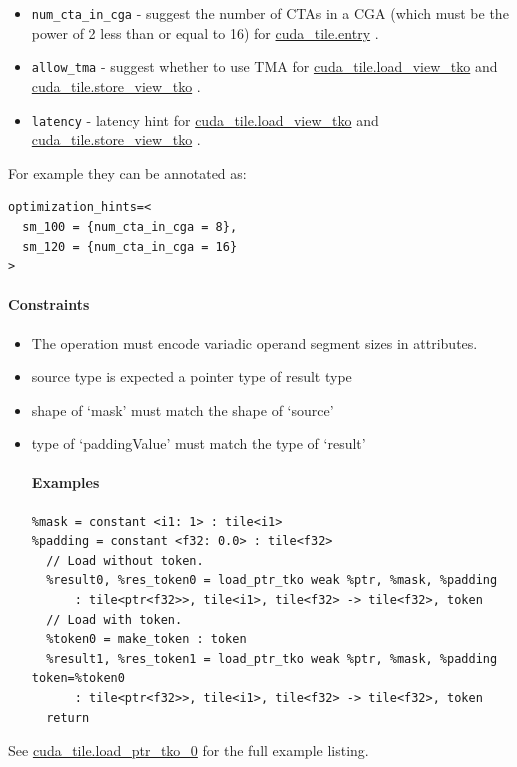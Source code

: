\documentclass{article}
\begin{document}
\begin{itemize}
\item \texttt{num\_cta\_in\_cga} - suggest the number of CTAs in a CGA (which must be the power of 2 less than or equal to 16) for \href{https://docs.nvidia.com/cuda/tile-ir/latest/sections/operations.html#op-cuda-tile-entry}{cuda\_tile.entry} .
\item \texttt{allow\_tma} - suggest whether to use TMA for \href{https://docs.nvidia.com/cuda/tile-ir/latest/sections/operations.html#op-cuda-tile-load-view-tko}{cuda\_tile.load\_view\_tko} and \href{https://docs.nvidia.com/cuda/tile-ir/latest/sections/operations.html#op-cuda-tile-store-view-tko}{cuda\_tile.store\_view\_tko} .
\item \texttt{latency} - latency hint for \href{https://docs.nvidia.com/cuda/tile-ir/latest/sections/operations.html#op-cuda-tile-load-view-tko}{cuda\_tile.load\_view\_tko} and \href{https://docs.nvidia.com/cuda/tile-ir/latest/sections/operations.html#op-cuda-tile-store-view-tko}{cuda\_tile.store\_view\_tko} .

\end{itemize}
For example they can be annotated as:


\begin{lstlisting}
optimization_hints=<
  sm_100 = {num_cta_in_cga = 8},
  sm_120 = {num_cta_in_cga = 16}
>
\end{lstlisting}


\paragraph{Constraints}

\begin{itemize}
\item The operation must encode variadic operand segment sizes in attributes.
\item source type is expected a pointer type of result type
\item shape of `mask' must match the shape of `source'
\item type of `paddingValue' must match the type of `result'


\paragraph{Examples}

\begin{lstlisting}
%mask = constant <i1: 1> : tile<i1>
%padding = constant <f32: 0.0> : tile<f32>
  // Load without token.
  %result0, %res_token0 = load_ptr_tko weak %ptr, %mask, %padding
      : tile<ptr<f32>>, tile<i1>, tile<f32> -> tile<f32>, token
  // Load with token.
  %token0 = make_token : token
  %result1, %res_token1 = load_ptr_tko weak %ptr, %mask, %padding token=%token0
      : tile<ptr<f32>>, tile<i1>, tile<f32> -> tile<f32>, token
  return
\end{lstlisting}

\end{itemize}
See \href{https://docs.nvidia.com/cuda/tile-ir/latest/sections/appendix.html#example-cuda-tile-load-ptr-tko-0}{cuda\_tile.load\_ptr\_tko\_0} for the full example listing.
\end{document}
